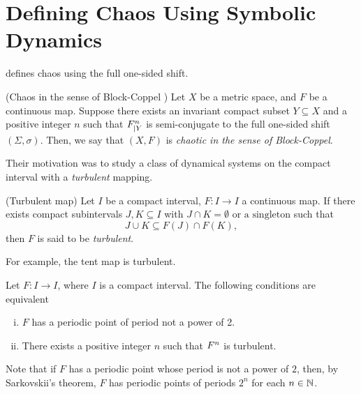\documentclass[10pt,twoside]{book}
\begin{document}
\section{Defining Chaos Using Symbolic Dynamics}
\citet{blockcoppel} defines chaos using the full one-sided shift.
\begin{definition}
  (Chaos in the sense of Block-Coppel \citep{blockcoppel})
  Let $X$ be a metric space, and $F$ be a continuous map.
  Suppose there exists an invariant compact subset $Y \subseteq X$ and a positive integer $n$ such that $F^{n}_{|Y}$ is semi-conjugate to the full one-sided shift $(\Sigma, \sigma)$.
  Then, we say that $(X,F)$ is \textit{chaotic in the sense of Block-Coppel}.
  \begin{center}
  \end{center}
  \label{defn:blockcoppel}
\end{definition}
Their motivation was to study a class of dynamical systems on the compact interval with a \textit{turbulent} mapping.
\begin{definition}
  (Turbulent map)
  Let $I$ be a compact interval, $F: I \to I$ a continuous map.
  If there exists compact subintervals $J,K \subseteq I$ with $J \cap K = \emptyset \mbox{ or a singleton}$ such that
  \begin{equation*}
    J \cup K \subseteq F(J) \cap F(K),
  \end{equation*}
  then $F$ is said to be \textit{turbulent}.
\end{definition}
For example, the tent map is turbulent.
\begin{theorem}
  \citep[Chap.II]{blockcoppel}
  Let $F: I \to I$, where $I$ is a compact interval.
  The following conditions are equivalent
  \begin{enumerate}[(i)]
    \item $F$ has a periodic point of period not a power of 2.
    \item There exists a positive integer $n$ such that $F^{n}$ is turbulent.
  \end{enumerate}
  \label{thm:blcpII}
\end{theorem}
Note that if $F$ has a periodic point whose period is not a power of $2$, then, by Sarkovskii's theorem, $F$ has periodic points of periods $2^n$ for each $n \in \mathbb{N}$.





\printindex
\end{document}
